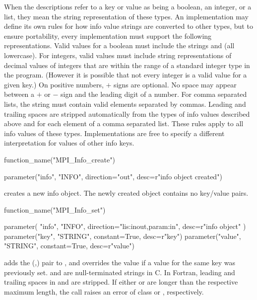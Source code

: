 When the descriptions refer to a key or value as being a boolean, an
integer, or a list, they mean the string representation of these
types.  An implementation may define its own rules for how info value
strings are converted to other types, but to ensure portability, every
implementation must support the following representations.  Valid
values for a boolean must include the strings  and 
(all lowercase).  For integers, valid values must include string
representations of decimal values of integers that are within the
range of a standard integer type in the program.  (However it is
possible that not every integer is a valid value for a given
key.)  On positive numbers, $+$ signs are optional.  No space may
appear between a $+$ or $-$ sign and the leading digit of a number.  For
comma separated lists, the string must contain valid elements
separated by commas.  Leading and trailing spaces are stripped
automatically from the types of info values described above and for
each element of a comma separated list.  These rules apply to all info
values of these types.  Implementations are free to specify a
different interpretation for values of other info keys.

%
\begin{mpi-binding}
    function_name("MPI_Info_create")
    
    parameter("info", "INFO", direction="out", desc=r"info object created")
\end{mpi-binding}

 creates a new info object. The newly created object contains
no key/value pairs. 

%
\begin{mpi-binding}
    function_name("MPI_Info_set")
    
    parameter(
        "info", "INFO", direction="lis:inout,param:in", desc=r"info object"
    )
    parameter("key", "STRING", constant=True, desc=r"key")
    parameter("value", "STRING", constant=True, desc=r"value")
\end{mpi-binding}

 adds the (,) pair to , and  overrides the value if a value for the same key was previously set. 
 and  are null-terminated strings in C. 
In Fortran, leading and trailing spaces in  and  are stripped. 
If either  or  are longer than 
the respective maximum length, the call raises an error of class  or
, respectively.

